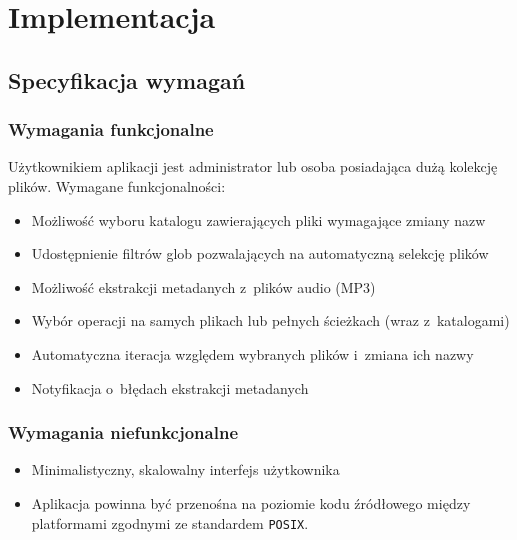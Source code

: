 \chapter{Implementacja}
\label{implementacja}

\section{Specyfikacja wymagań}
\label{specyfikacja-wymagan}

\subsection{Wymagania funkcjonalne}
Użytkownikiem aplikacji jest administrator lub osoba posiadająca dużą kolekcję plików.
Wymagane funkcjonalności:
\begin{itemize}
\item Możliwość wyboru katalogu zawierających pliki wymagające zmiany nazw
\item Udostępnienie filtrów glob pozwalających na automatyczną selekcję plików
\item Możliwość ekstrakcji metadanych z~plików audio (MP3)
\item Wybór operacji na samych plikach lub pełnych ścieżkach (wraz z~katalogami)
\item Automatyczna iteracja względem wybranych plików i~zmiana ich nazwy
\item Notyfikacja o~błędach ekstrakcji metadanych
\end{itemize}

\subsection{Wymagania niefunkcjonalne}
\begin{itemize}
\item Minimalistyczny, skalowalny interfejs użytkownika
\item Aplikacja powinna być przenośna na poziomie kodu źródłowego między platformami zgodnymi ze standardem \texttt{POSIX}.
\end{itemize}

